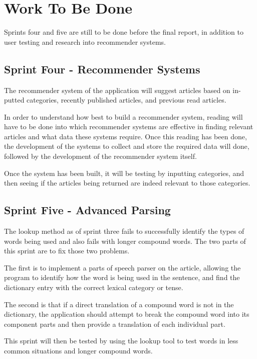 \chapter{Work To Be Done}

Sprints four and five are still to be done before the final report, in addition to user testing and research into recommender systems.

\section{Sprint Four - Recommender Systems}

The recommender system of the application will suggest articles based on in-putted categories, recently published articles, and previous read articles. 

In order to understand how best to build a recommender system, reading will have to be done into which recommender systems are effective in finding relevant articles and what data these systems require. Once this reading has been done, the development of the systems to collect and store the required data will done, followed by the development of the recommender system itself.

Once the system has been built, it will be testing by inputting categories, and then seeing if the articles being returned are indeed relevant to those categories. 

\section{Sprint Five - Advanced Parsing }

The lookup method as of sprint three fails to successfully identify the types of words being used and also fails with longer compound words. The two parts of this sprint are to fix those two problems.

The first is to implement a parts of speech parser on the article, allowing the program to identify how the word is being used in the sentence, and find the dictionary entry with the correct lexical category or tense.

The second is that if a direct translation of a compound word is not in the dictionary, the application should attempt to break the compound word into its component parts and then provide a translation of each individual part. 

This sprint will then be tested by using the lookup tool to test words in less common situations and longer compound words.
